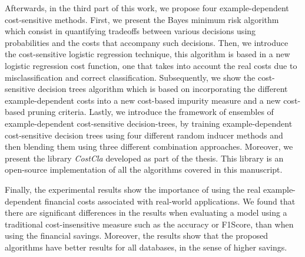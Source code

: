 Afterwards, in the third part of this work, we propose four example-dependent cost-sensitive 
methods. First, we present the Bayes minimum risk algorithm which consist in quantifying tradeoffs 
between various decisions using probabilities and the costs that accompany such decisions. Then, we 
introduce the cost-sensitive logistic regression technique, this algorithm is based in a new 
logistic regression cost function, one that takes into account the real costs due to 
misclassification and correct classification. Subsequently, we show the cost-sensitive decision 
trees algorithm which is based on incorporating the different example-dependent costs into a new 
cost-based impurity measure and a new cost-based pruning criteria. Lastly, we introduce the 
framework of ensembles of example-dependent cost-sensitive decision-trees, by training 
example-dependent cost-sensitive decision trees using four different random inducer methods and then 
blending them using three different combination approaches. Moreover, we present the library 
\mbox{\textit{CostCla}} developed as part of the thesis. This library is an open-source 
implementation of all the algorithms covered in this manuscript.

Finally, the experimental results show the importance of using the real example-dependent financial 
costs associated with real-world applications. We found that there are significant differences 
in the results when evaluating a model using a traditional cost-insensitive measure such as the 
accuracy or F1Score, than when using the financial savings. Moreover, the results show that the 
proposed algorithms have better results for all databases, in the sense of higher savings.